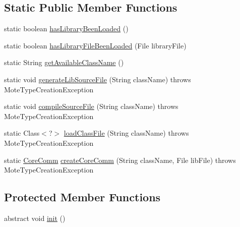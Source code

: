 \subsection*{Static Public Member Functions}
\begin{DoxyCompactItemize}
\item 
static boolean \hyperlink{classorg_1_1contikios_1_1cooja_1_1CoreComm_a213d377ca212f4d2954218b8dfc2aead}{has\-Library\-Been\-Loaded} ()
\item 
static boolean \hyperlink{classorg_1_1contikios_1_1cooja_1_1CoreComm_a45c2faad923d4f33614f6ed4e82a4a36}{has\-Library\-File\-Been\-Loaded} (File library\-File)
\item 
static String \hyperlink{classorg_1_1contikios_1_1cooja_1_1CoreComm_a2e2fa7e2f9ffa0c4827f940791680447}{get\-Available\-Class\-Name} ()
\item 
static void \hyperlink{classorg_1_1contikios_1_1cooja_1_1CoreComm_a9bf122532833fd5c093649e06950f62d}{generate\-Lib\-Source\-File} (String class\-Name)  throws Mote\-Type\-Creation\-Exception 
\item 
static void \hyperlink{classorg_1_1contikios_1_1cooja_1_1CoreComm_af6d4093df45a4bf1d22e82b4ae0a8f76}{compile\-Source\-File} (String class\-Name)  throws Mote\-Type\-Creation\-Exception 
\item 
static Class$<$?$>$ \hyperlink{classorg_1_1contikios_1_1cooja_1_1CoreComm_ab9c811edc26e54ef6cb8dfbaa54a01f1}{load\-Class\-File} (String class\-Name)  throws Mote\-Type\-Creation\-Exception 
\item 
static \hyperlink{classorg_1_1contikios_1_1cooja_1_1CoreComm}{Core\-Comm} \hyperlink{classorg_1_1contikios_1_1cooja_1_1CoreComm_a14cb8778960244ee77a6c94eb940270e}{create\-Core\-Comm} (String class\-Name, File lib\-File)  throws Mote\-Type\-Creation\-Exception 
\end{DoxyCompactItemize}
\subsection*{Protected Member Functions}
\begin{DoxyCompactItemize}
\item 
abstract void \hyperlink{classorg_1_1contikios_1_1cooja_1_1CoreComm_a50bd0205ea051af5404a2ffd44155899}{init} ()
\end{DoxyCompactItemize}


